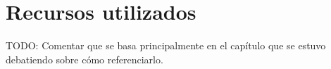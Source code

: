 %

\section{Recursos utilizados}  

TODO: Comentar que se basa principalmente en el capítulo que se estuvo 
debatiendo sobre cómo referenciarlo.


